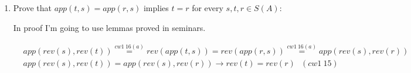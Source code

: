 \documentclass{article}
\begin{document}
\begin{enumerate}
\begin{enumerate}
\end{enumerate}
\newpage

\item Prove that $app(t, s) = app(r, s)$ implies $t = r$ for every $s, t, r \in S(A)$:

In proof I'm going to use lemmas proved in seminars.

\begin{align*}
&app(rev(s), rev(t)) \stackrel{cw1 \: 16(a)}{=} rev(app(t, s)) = rev(app(r, s)) \stackrel{cw1 \: 16(a)}{=} app(rev(s), rev(r))\\
&app(rev(s), rev(t)) = app(rev(s), rev(r)) \to rev(t) = rev(r) \:\:\:(cw1 \: 15)
\end{align*}

\end{enumerate}
\end{document}
